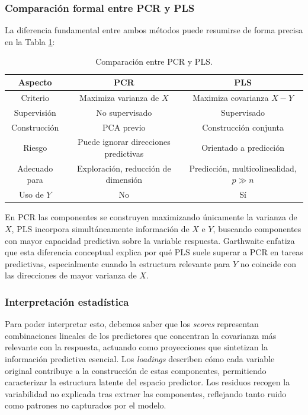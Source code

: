 \documentclass[12pt,a4paper]{report}
\begin{document}
\subsubsection*{Comparación formal entre PCR y PLS}

La diferencia fundamental entre ambos métodos puede resumirse de forma precisa en la Tabla \ref{tabla:pcr_pls}:

\begin{table}[H]
\centering
\small
\caption{Comparación entre PCR y PLS.}
\label{tabla:pcr_pls}

\begin{tabular}{|c|c|c|}
\hline
\textbf{Aspecto} & \textbf{PCR} & \textbf{PLS} \\ \hline \hline
Criterio & Maximiza varianza de $X$ & Maximiza covarianza $X-Y$ \\ \hline
Supervisión & No supervisado & Supervisado \\ \hline
Construcción & PCA previo & Construcción conjunta \\ \hline
Riesgo & Puede ignorar direcciones predictivas & Orientado a predicción \\ \hline
Adecuado para & Exploración, reducción de dimensión & Predicción, multicolinealidad, $p \gg n$ \\ \hline
Uso de $Y$ & No & Sí \\ \hline
\end{tabular}

\end{table}

En PCR las componentes se construyen maximizando únicamente la varianza de \(X\), PLS incorpora simultáneamente información de \(X\) e \(Y\), buscando componentes con mayor capacidad predictiva sobre la variable respuesta. Garthwaite \cite{garthwaite1994} enfatiza que esta diferencia conceptual explica por qué PLS suele superar a PCR en tareas predictivas, especialmente cuando la estructura relevante para \(Y\) no coincide con las direcciones de mayor varianza de \(X\).

\subsubsection*{Interpretación estadística}

Para poder interpretar esto, debemos saber que los \textit{scores} representan combinaciones lineales de los predictores que concentran la covarianza más relevante con la respuesta, actuando como proyecciones que sintetizan la información predictiva esencial. Los \textit{loadings} describen cómo cada variable original contribuye a la construcción de estas componentes, permitiendo caracterizar la estructura latente del espacio predictor. Los residuos recogen la variabilidad no explicada tras extraer las componentes, reflejando tanto ruido como patrones no capturados por el modelo.
\end{document}
